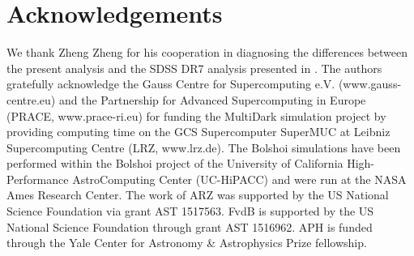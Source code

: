 \documentclass[usenatbib,usegraphicx,letterpaper]{mn2e}
\begin{document}
\section{Acknowledgements}
\label{section:acknowledgements}

We thank Zheng Zheng for his cooperation in diagnosing the
differences between the present analysis and the SDSS DR7
analysis presented in \citet{zehavi_etal11}.
The authors gratefully acknowledge the Gauss Centre for Supercomputing
e.V. (www.gauss-centre.eu) and the Partnership for Advanced
Supercomputing in Europe (PRACE, www.prace-ri.eu) for funding the
MultiDark simulation project by providing computing time on the GCS
Supercomputer SuperMUC at Leibniz Supercomputing Centre (LRZ,
www.lrz.de). The Bolshoi simulations have been performed within the
Bolshoi project of the University of California High-Performance
AstroComputing Center (UC-HiPACC) and were run at the NASA Ames
Research Center. The work of ARZ was supported by the US National Science
Foundation via grant AST 1517563. FvdB is supported by the US National Science
Foundation through grant AST 1516962. APH is funded through the Yale Center 
for Astronomy \& Astrophysics Prize fellowship. 




\end{document}
